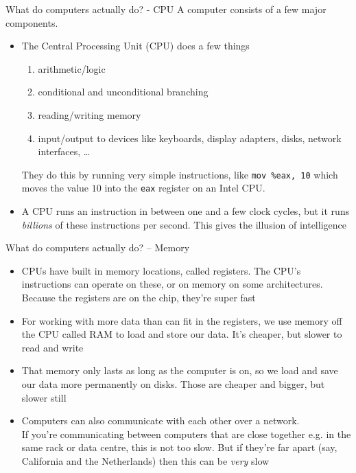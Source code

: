 \documentclass{beamer}
\begin{document}
\begin{frame}{What do computers actually do? - CPU}
	A computer consists of a few major components.
	\begin{itemize}
		\item The Central Processing Unit (CPU) does a few things
			\begin{enumerate}
				\item arithmetic/logic
				\item conditional and unconditional branching
				\item reading/writing memory
				\item input/output to devices like keyboards, display adapters, disks, network interfaces, \ldots
		\end{enumerate}

		They do this by running very simple instructions, like \texttt{mov
		\%eax, 10} which moves the value $10$ into the \texttt{eax} register on
		an Intel CPU.
		
		\item A CPU runs an instruction in between one and a few clock cycles,
		but it runs \emph{billions} of these instructions per second. This gives
		the illusion of intelligence
		
	\end{itemize}
\end{frame}

\begin{frame}{What do computers actually do? -- Memory}
	\begin{itemize}
		\item CPUs have built in memory locations, called registers. The CPU's
		instructions can operate on these, or on memory on some architectures.
		Because the registers are on the chip, they're super fast
		
		\item For working with more data than can fit in the registers, we use
		memory off the CPU called RAM to load and store our data. It's cheaper,
		but slower to read and write
		
		\item That memory only lasts as long as the computer is on, so we load
		and save our data more permanently on disks. Those are cheaper and
		bigger, but slower still
		
		\item Computers can also communicate with each other over a network.
			\\
			If you're communicating between computers that
			are close together e.g. in the same rack or data centre, this is not too slow.
			But if they're far apart (say, California
			and the Netherlands) then this can be \emph{very} slow
	\end{itemize}
\end{frame}
\end{document}
